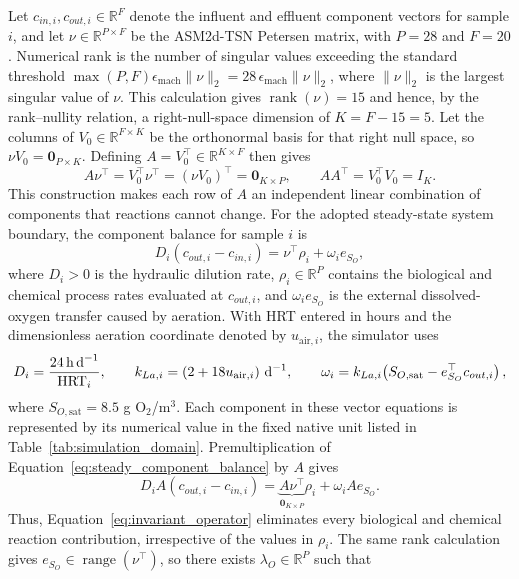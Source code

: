 \documentclass[a4paper,fleqn]{cas-sc}
\begin{document}
Let $c_{in,i},c_{out,i}\in\mathbb{R}^{F}$ denote the influent and effluent component vectors for sample $i$, and let $\nu\in\mathbb{R}^{P\times F}$ be the ASM2d-TSN Petersen matrix, with $P=28$ and $F=20$. Numerical rank is the number of singular values exceeding the standard threshold $\max(P,F)\epsilon_{\mathrm{mach}}\|\nu\|_2=28\,\epsilon_{\mathrm{mach}}\|\nu\|_2$, where $\|\nu\|_2$ is the largest singular value of $\nu$. This calculation gives $\operatorname{rank}(\nu)=15$ and hence, by the rank--nullity relation, a right-null-space dimension of $K=F-15=5$. Let the columns of $V_0\in\mathbb{R}^{F\times K}$ be the orthonormal basis for that right null space, so $\nu V_0=\mathbf{0}_{P\times K}$. Defining $A=V_0^\top\in\mathbb{R}^{K\times F}$ then gives
\begin{equation}
\label{eq:invariant_operator}
A\nu^\top=V_0^\top\nu^\top=(\nu V_0)^\top=\mathbf{0}_{K\times P},
\qquad
AA^\top=V_0^\top V_0=I_K.
\end{equation}
This construction makes each row of $A$ an independent linear combination of components that reactions cannot change. For the adopted steady-state system boundary, the component balance for sample $i$ is
\begin{equation}
\label{eq:steady_component_balance}
D_i(c_{out,i}-c_{in,i})=\nu^\top\rho_i+\omega_i e_{S_O},
\end{equation}
where $D_i>0$ is the hydraulic dilution rate, $\rho_i\in\mathbb{R}^{P}$ contains the biological and chemical process rates evaluated at $c_{out,i}$, and $\omega_i e_{S_O}$ is the external dissolved-oxygen transfer caused by aeration. With HRT entered in hours and the dimensionless aeration coordinate denoted by $u_{\mathrm{air},i}$, the simulator uses
\begin{equation}
D_i=\frac{24\,\mathrm{h\,d}^{-1}}{\mathrm{HRT}_i},\qquad
k_{La,i}=(2+18u_{\mathrm{air},i})\ {\rm d}^{-1},\qquad
\omega_i=k_{La,i}\!\left(S_{O,\mathrm{sat}}-e_{S_O}^\top c_{out,i}\right),
\end{equation}
where $S_{O,\mathrm{sat}}=8.5$ g O$_2$/m$^3$. Each component in these vector equations is represented by its numerical value in the fixed native unit listed in Table~\ref{tab:simulation_domain}. Premultiplication of Equation~\eqref{eq:steady_component_balance} by $A$ gives
\begin{equation}
\label{eq:invariant_balance}
D_iA(c_{out,i}-c_{in,i})
=\underbrace{A\nu^\top}_{\mathbf{0}_{K\times P}}\rho_i+\omega_iAe_{S_O}.
\end{equation}
Thus, Equation~\eqref{eq:invariant_operator} eliminates every biological and chemical reaction contribution, irrespective of the values in $\rho_i$. The same rank calculation gives $e_{S_O}\in\operatorname{range}(\nu^\top)$, so there exists $\lambda_O\in\mathbb{R}^{P}$ such that
\end{document}
